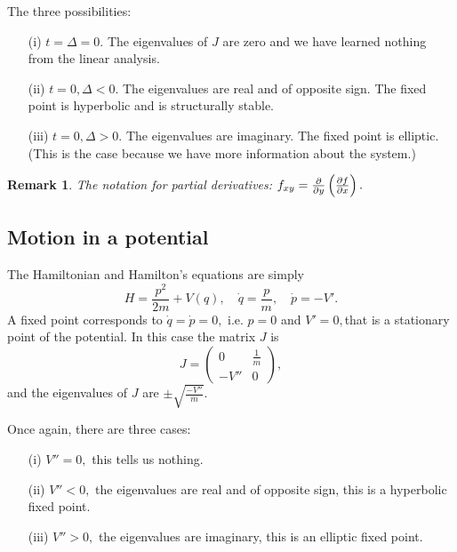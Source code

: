 \documentclass[12pt, a4paper]{article}
\newcommand{\f}[2]{\frac{#1}{#2}}
\newtheorem*{remark}{Remark}
\theoremstyle{definition}
\theoremstyle{plain}
\begin{document}
The three possibilities: 

\begin{enumerate}
	
	\item[(i)] $t=\Delta=0.$ The eigenvalues of $J$ are zero and we have learned nothing from the linear analysis.

	\item[(ii)] $t=0,\Delta<0.$ The eigenvalues are real and of opposite sign. The fixed point is hyperbolic and is structurally stable.

	\item[(iii)] $t=0, \Delta>0.$ The eigenvalues are imaginary. The fixed point is elliptic. (This is the case because we have more information about the system.)


\end{enumerate}

\begin{remark}
The notation for partial derivatives: $f_{xy}= \pdv{}{y}\left(\pdv{f}{x}\right).$
\end{remark}

\subsection{Motion in a potential}

The Hamiltonian and Hamilton's equations are simply $$H=\f{p^2}{2m}+V(q), \quad \dot{q}=\f{p}{m}, \quad \dot{p}=-V'.$$ A fixed point corresponds to $\dot{q}=\dot{p}=0,$ i.e. $p=0$ and $V'=0,$that is a stationary point of the potential. In this case the matrix $J$ is $$J=\begin{pmatrix} 0 & \f{1}{m} \\ -V'' & 0 \end{pmatrix},$$ and the eigenvalues of $J$ are $\pm\sqrt{\f{-V''}{m}}.$

Once again, there are three cases:
\begin{enumerate}
	
	\item[(i)] $V''=0,$ this tells us nothing.

	\item[(ii)] $V''<0,$  the eigenvalues are real and of opposite sign, this is a hyperbolic fixed point.

	\item[(iii)] $V''>0,$ the eigenvalues are imaginary, this is an elliptic fixed point.

\end{enumerate}
\end{document}
